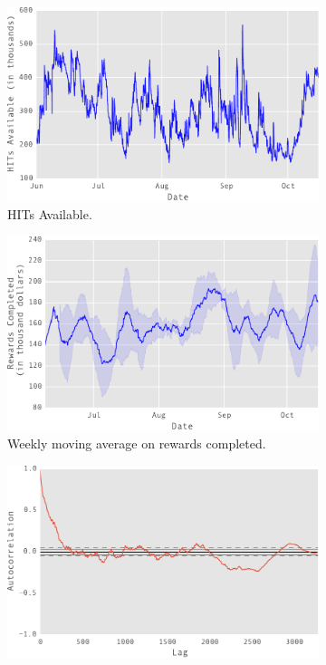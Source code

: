 \begin{figure}[tb]
    \centering
    \begin{subfigure}[b]{0.48\textwidth}
        \centering
        \includegraphics[width=\textwidth]{figures/out}
        \caption{HITs Available.}
        \label{fig:hitav}
    \end{subfigure}
    \hfill
    \begin{subfigure}[b]{0.48\textwidth}
        \centering
        \includegraphics[width=\textwidth]{figures/mac}
        \caption{Weekly moving average on rewards completed.}
        \label{fig:mac}
    \end{subfigure}
    \hfill
    \begin{subfigure}[b]{0.48\textwidth}
        \centering
        \includegraphics[width=\textwidth]{figures/out1}

\end{subfigure}
\end{figure}
